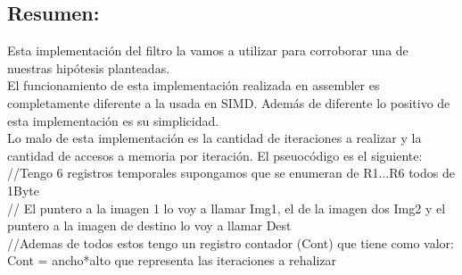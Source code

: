 \subsection{Resumen:}
Esta implementación del filtro la vamos a utilizar para corroborar una de nuestras hipótesis planteadas. \\
El funcionamiento de esta implementación realizada en assembler es completamente diferente a la usada en SIMD. Además de diferente lo positivo de esta implementación es su simplicidad. \\
Lo malo de esta implementación es la cantidad de iteraciones a realizar y la cantidad de accesos a memoria por iteración.
El pseuocódigo es el siguiente:\\
//Tengo 6 registros temporales supongamos que se enumeran de R1...R6 todos de 1Byte\\
// El puntero a la imagen 1 lo voy a llamar Img1, el de la imagen dos Img2 y el puntero a la imagen de destino lo voy a llamar Dest\\
//Ademas de todos estos tengo un registro contador (Cont) que tiene como valor: Cont = ancho*alto que representa las iteraciones a rehalizar\\

